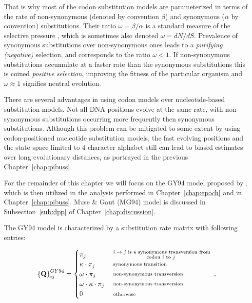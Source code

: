 That is why most of the codon substitution models are parameterized in terms of the rate of non-synonymous (denoted by convention $\beta$) and synonymous ($\alpha$ by convention) substitutions.
Their ratio $\omega=\beta / \alpha$ is a standard measure of the selective pressure \citep{ThePhylogeneticHandbook}, which is sometimes also denoted $\omega = dN/dS$.
Prevalence of synonymous substitutions over non-synonymous ones leads to a \emph{purifying (negative)} selection, and corresponds to the ratio $\omega <1$.
If non-synonymous substitutions accumulate at a faster rate than the synonymous substitutions this is coined \emph{positive selection}, improving the fitness of the particular organism and $\omega\approx 1$ signifies neutral evolution.

There are several advantages in using codon models over nucleotide-based substitution models.
Not all DNA positions evolve at the same rate, with non-synonymous substitutions occurring more frequently then synonymous substitutions.
Although this problem can be mitigated to some extent by using codon-positioned nucleotide substitution models, the fast evolving positions and the state space limited to $4$ character alphabet still can lead to biased estimates over long evolutionary distances, as portrayed in the previous Chapter~\ref{chap:pibuss}.

For the remainder of this chapter we will focus on the GY94 model proposed by \cite{Goldman1994}, which is then utilized in the analysis performed in Chapter~\ref{chap:epoch} and in Chapter~\ref{chap:pibuss}.  
Muse \& Gaut (MG94) model is discussed in Subsection~\ref{sub:dpp} of Chapter~\ref{chap:discussion}.

The GY94 model is characterized by a substitution rate matrix with following entries:

\begin{equation}
\left\{ \mathbf{Q}\right\} _{ij}^{GY94}=
\begin{cases}
\pi_{j} & \substack{ \text{ \ensuremath{i\rightarrow j} is a synonymous transversion from } \\ \text{codon \ensuremath{i} to \ensuremath{j} } } \\  
\kappa\cdot\pi_{j} & \substack{ \text{ synonymous transition } } \\
\omega\cdot\pi_{j} & \substack{ \text{ non-synonymous transversion } } \\
\omega\cdot\kappa\cdot\pi_{j} & \substack{ \text{ non-synonymous transversion } } \\
0 & \substack{ \text{ otherwise} }
\end{cases},
\label{eq:gy94}
\end{equation}

